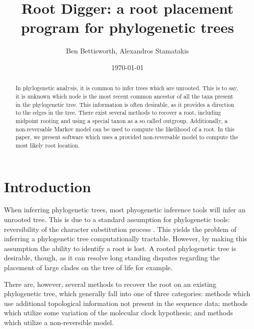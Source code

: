 \documentclass{article}
\title{Root Digger: a root placement program for phylogenetic trees}
\author{Ben Bettisworth, Alexandros Stamatakis}
\date{\today}
\begin{document}
\begin{abstract}
  In phylogenetic analysis, it is common to infer trees which are unrooted.
  This is to say, it is unknown which node is the most recent common ancestor of
  all the taxa present in the phylogenetic tree.
  This information is often desirable, as it provides a direction to the edges in
  the tree.
  There exist several methods to recover a root, including midpoint rooting and
  using a special taxon as a so called outgroup.
  Additionally, a non-reversable Markov model can be used to compute the
  likelihood of a root.
  In this paper, we present software which uses a provided non-reversable model
  to compute the most likely root location.
\end{abstract}

\maketitle


\section{Introduction}


When inferring phylogenetic trees, most phyogenetic inference tools
\cite{nguyen_iq-tree:_2015, stamatakis_raxml_2014, minh_iq-tree_2019} will infer
an unrooted tree. This is due to a standard assumption for phylogenetic tools:
reversibility of the character substitution process
\cite{felsenstein_evolutionary_1981}.  This yields the problem of inferring a
phylogenetic tree computationally tractable.  However, by making this assumption
the ability to identify a root is lost. A rooted phylogenetic tree is desirable,
though, as it can resolve long standing disputes regarding the placement of
large clades on the tree of life \cite{dunn_animal_2014} for example.

There are, however, several methods to recover the root on an existing
phylogenetic tree, which generally fall into one of three categories: methods
which use additional topological information not present in the sequence data;
methods which utilize some variation of the molecular clock hypothesis; and
methods which utilize a non-reversible model.
\end{document}
